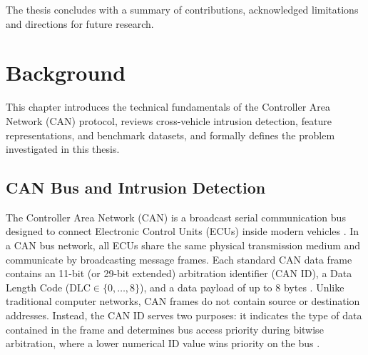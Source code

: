 \documentclass[12pt, a4paper, reqno, oneside]{book}
\begin{document}
The thesis concludes with a summary of contributions, acknowledged limitations and directions for future research.



\chapter{Background}
\label{chap:background}

This chapter introduces the technical fundamentals of the Controller Area Network (CAN) protocol, reviews cross-vehicle intrusion detection, feature representations, and benchmark datasets, and formally defines the problem investigated in this thesis.

\section{CAN Bus and Intrusion Detection}
\label{subsec:can_intrusion_detection}

The Controller Area Network (CAN) is a broadcast serial communication bus designed to connect Electronic Control Units (ECUs) inside modern vehicles \cite{song2020invehicle, lee2017otids}. In a CAN bus network, all ECUs share the same physical transmission medium and communicate by broadcasting message frames. Each standard CAN data frame contains an 11-bit (or 29-bit extended) arbitration identifier (CAN ID), a Data Length Code ($\text{DLC} \in \{0, \dots, 8\}$), and a data payload of up to 8 bytes \cite{lampe2024curated}. Unlike traditional computer networks, CAN frames do not contain source or destination addresses. Instead, the CAN ID serves two purposes: it indicates the type of data contained in the frame and determines bus access priority during bitwise arbitration, where a lower numerical ID value wins priority on the bus \cite{song2020invehicle}.
\end{document}
